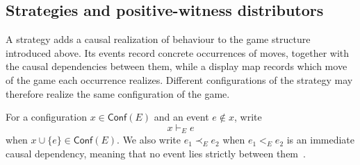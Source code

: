 \documentclass[oneside]{article}
\newcommand{\Conf}{\mathsf{Conf}}
\theoremstyle{plain}
\theoremstyle{definition}
\theoremstyle{remark}
\begin{document}
\subsection{Strategies and positive-witness distributors}
\label{subsec:cgqg-background-strategies}

A strategy adds a causal realization of behaviour to the game structure introduced above. Its events record concrete occurrences of moves, together with the causal dependencies between them, while a display map records which move of the game each occurrence realizes. Different configurations of the strategy may therefore realize the same configuration of the game.

For a configuration \(x\in\Conf(E)\) and an event \(e\notin x\), write
\[
    x\vdash_E e
\]
when \(x\cup\{e\}\in\Conf(E)\). We also write \(e_1\prec_E e_2\) when \(e_1<_{E}e_2\) is an immediate causal dependency, meaning that no event lies strictly between them~\cite[\S4.1.1]{ClairambaultOlimpieriPaquet2025}.
\end{document}
